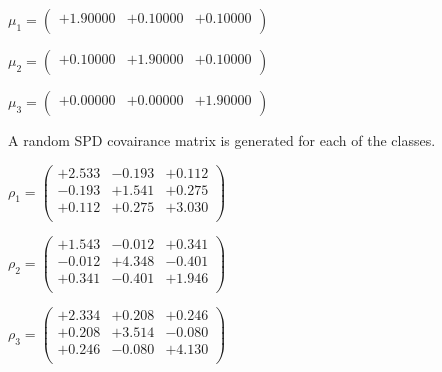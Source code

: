 \documentclass[12pt]{article}
\theoremstyle{definition}
\theoremstyle{remark}
\numberwithin{equation}{section}
\begin{document}
$\mu_1 = \left(
\begin{array}{
ccc}
+1.90000 & +0.10000 & +0.10000 \\
\end{array}
\right)$

$\mu_2 = \left(
\begin{array}{
ccc}
+0.10000 & +1.90000 & +0.10000 \\
\end{array}
\right)$

$\mu_3 = \left(
\begin{array}{
ccc}
+0.00000 & +0.00000 & +1.90000 \\
\end{array}
\right)$

A random SPD covairance matrix is generated for each of the classes.\newline

$\rho_1 = \left(
\begin{array}{
ccc}
+2.533 & -0.193 & +0.112 \\
-0.193 & +1.541 & +0.275 \\
+0.112 & +0.275 & +3.030 \\
\end{array}
\right)$

$\rho_2 = \left(
\begin{array}{
ccc}
+1.543 & -0.012 & +0.341 \\
-0.012 & +4.348 & -0.401 \\
+0.341 & -0.401 & +1.946 \\
\end{array}
\right)$

$\rho_3 = \left(
\begin{array}{
ccc}
+2.334 & +0.208 & +0.246 \\
+0.208 & +3.514 & -0.080 \\
+0.246 & -0.080 & +4.130 \\
\end{array}
\right)$
\end{document}
